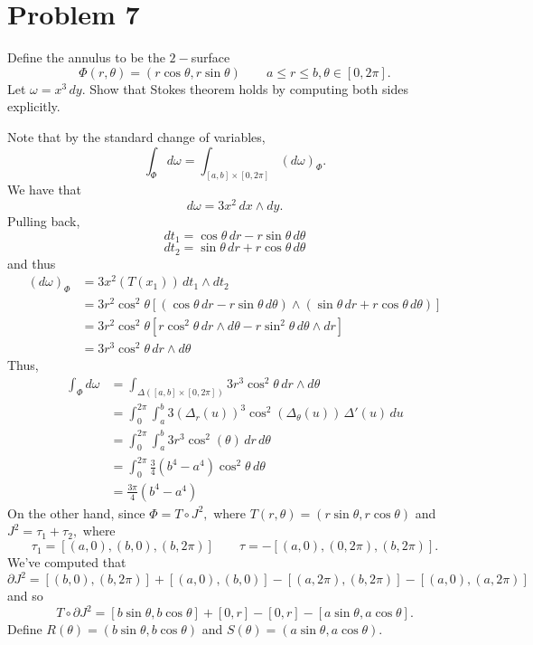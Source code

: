 \documentclass[11pt]{article}
\begin{document}
\section*{Problem 7}
\begin{problem}
    Define the annulus to be the $2-$surface 
    \[\Phi(r,\theta) = (r\cos \theta, r\sin \theta)\qquad a\leq r\leq b, \theta \in [0,2\pi].\]Let $\omega = x^3\,dy.$ Show that Stokes theorem holds by computing both sides explicitly.
\end{problem}
\begin{solution}
Note that by the standard change of variables, 
\[\int_{\Phi}d\omega = \int_{[a,b]\times [0,2\pi]}(d\omega)_\Phi.\] 
We have that 
    \[d\omega = 3x^2\,dx \wedge dy.\] 
Pulling back, 
\[dt_1 = \cos \theta \,dr -r\sin\theta\,d\theta\]
\[dt_2 = \sin\theta\,dr + r\cos\theta\,d\theta\] and thus 
\begin{align*}
    (d\omega)_\Phi &= 3x^2(T(x_1))\,dt_1 \wedge dt_2\\
    &= 3r^2\cos^2\theta \left[(\cos \theta \,dr -r\sin\theta\,d\theta) \wedge (\sin\theta\,dr + r\cos\theta\,d\theta)\right]\\
    &= 3r^2\cos^2\theta[r\cos^2\theta\,dr\wedge d\theta - r\sin^2\theta\,d\theta \wedge dr]\\
    &= 3r^3\cos^2 \theta \,dr\wedge d\theta
\end{align*}
Thus, 
\begin{align*}
\int_{\Phi}d\omega &= \int_{\Delta([a,b]\times [0,2\pi])}3r^3\cos^2 \theta \,dr\wedge d\theta\\ &= \int_0^{2\pi}\int_a^b 3(\Delta_r(u))^3 \cos^2(\Delta_\theta(u))\, \Delta'(u)\,du\\ &= \int_0^{2\pi}\int_a^b 3r^3 \cos^2(\theta)\,dr\,d\theta   \\
&= \int_0^{2\pi} \frac{3}{4}(b^4 - a^4)\cos^2\theta \,d\theta\\
&= \frac{3\pi}{4}(b^4 - a^4)
\end{align*}
On the other hand, since $\Phi = T\circ J^2,$ where $T(r,\theta) = (r\sin\theta, r\cos \theta)$ and $J^2= \tau_1 + \tau_2, $ where 
\[\tau_1 = [(a,0), (b,0), (b, 2\pi)]\qquad \tau = -[(a,0), (0,2\pi), (b, 2\pi)].\] We've computed that 
\[\partial J^2 = [(b,0), (b, 2\pi)] + [(a,0), (b, 0)] - [(a,2\pi), (b, 2\pi)] - [(a,0), (a,2\pi)]\] and so 
\[T\circ \partial J^2 = [b\sin\theta, b\cos \theta] + [0, r] - [0, r] - [a\sin\theta, a\cos\theta].\] Define $R(\theta)= (b\sin\theta, b\cos\theta)$ and $S(\theta) = (a\sin\theta, a\cos \theta).$
\begin{align*}

\end{align*}
\end{solution}
\end{document}
